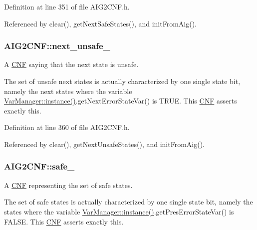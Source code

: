 Definition at line 351 of file A\-I\-G2\-C\-N\-F.\-h.



Referenced by clear(), get\-Next\-Safe\-States(), and init\-From\-Aig().

\hypertarget{classAIG2CNF_a0430b9b4ff38a7b0ae339fb0abd191c9}{
\subsubsection[{next\-\_\-unsafe\-\_\-}]{ A\-I\-G2\-C\-N\-F\-::next\-\_\-unsafe\-\_\-\hspace{0.3cm}{\ttfamily [protected]}}}\label{classAIG2CNF_a0430b9b4ff38a7b0ae339fb0abd191c9}


A \hyperlink{classCNF}{C\-N\-F} saying that the next state is unsafe. 

The set of unsafe next states is actually characterized by one single state bit, namely the next states where the variable \hyperlink{classVarManager_ac1a84b367c26dfc5ee9e612f7d61b288}{Var\-Manager\-::instance()}.get\-Next\-Error\-State\-Var() is T\-R\-U\-E. This \hyperlink{classCNF}{C\-N\-F} asserts exactly this. 

Definition at line 360 of file A\-I\-G2\-C\-N\-F.\-h.



Referenced by clear(), get\-Next\-Unsafe\-States(), and init\-From\-Aig().

\hypertarget{classAIG2CNF_a394d2a3600bc3bec864cf08acac61437}{
\subsubsection[{safe\-\_\-}]{ A\-I\-G2\-C\-N\-F\-::safe\-\_\-\hspace{0.3cm}{\ttfamily [protected]}}}\label{classAIG2CNF_a394d2a3600bc3bec864cf08acac61437}


A \hyperlink{classCNF}{C\-N\-F} representing the set of safe states. 

The set of safe states is actually characterized by one single state bit, namely the states where the variable \hyperlink{classVarManager_ac1a84b367c26dfc5ee9e612f7d61b288}{Var\-Manager\-::instance()}.get\-Pres\-Error\-State\-Var() is F\-A\-L\-S\-E. This \hyperlink{classCNF}{C\-N\-F} asserts exactly this. 


